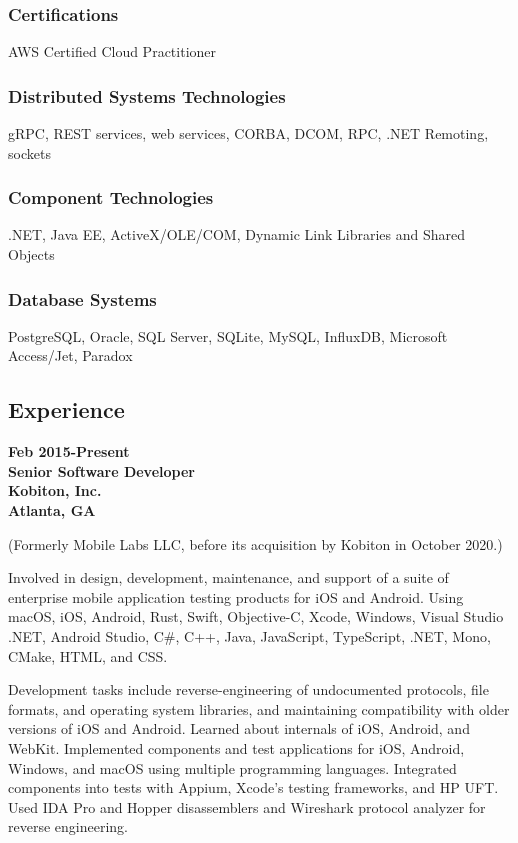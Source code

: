 \subsubsection{Certifications}\label{certifications}

AWS Certified Cloud Practitioner

\subsubsection{Distributed Systems
Technologies}\label{distributed-systems-technologies}

gRPC, REST services, web services, CORBA, DCOM, RPC, .NET Remoting,
sockets

\subsubsection{Component Technologies}\label{component-technologies}

.NET, Java EE, ActiveX/OLE/COM, Dynamic Link Libraries and Shared
Objects

\subsubsection{Database Systems}\label{database-systems}

PostgreSQL, Oracle, SQL Server, SQLite, MySQL, InfluxDB, Microsoft
Access/Jet, Paradox

\subsection{Experience}\label{experience}

\textbf{Feb 2015-Present\\
Senior Software Developer\\
Kobiton, Inc.\\
Atlanta, GA}

(Formerly Mobile Labs LLC, before its acquisition by Kobiton in October
2020.)

Involved in design, development, maintenance, and support of a suite of
enterprise mobile application testing products for iOS and Android.
Using macOS, iOS, Android, Rust, Swift, Objective-C, Xcode, Windows,
Visual Studio .NET, Android Studio, C\#, C++, Java, JavaScript,
TypeScript, .NET, Mono, CMake, HTML, and CSS.

Development tasks include reverse-engineering of undocumented protocols,
file formats, and operating system libraries, and maintaining
compatibility with older versions of iOS and Android. Learned about
internals of iOS, Android, and WebKit. Implemented components and test
applications for iOS, Android, Windows, and macOS using multiple
programming languages. Integrated components into tests with Appium,
Xcode's testing frameworks, and HP UFT. Used IDA Pro and Hopper
disassemblers and Wireshark protocol analyzer for reverse engineering.

